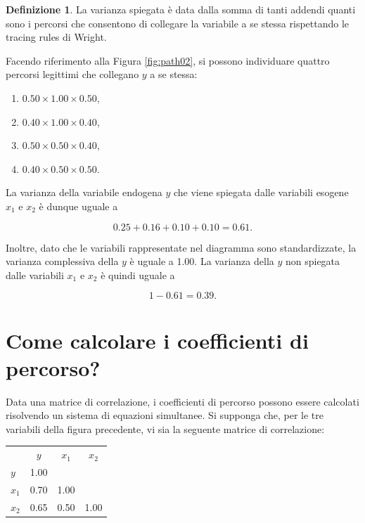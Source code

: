\documentclass[
  11pt,
]{krantz}
\providecommand{\tightlist}{%
  \setlength{\itemsep}{0pt}\setlength{\parskip}{0pt}}
\theoremstyle{definition}
\newtheorem{definition}{Definizione}[chapter]
\theoremstyle{definition}
\theoremstyle{definition}
\theoremstyle{definition}
\theoremstyle{remark}
\begin{document}
\begin{definition}
La varianza spiegata è data dalla somma di tanti addendi quanti sono i percorsi che consentono di collegare la variabile a se stessa rispettando le tracing rules di Wright.
\end{definition}

Facendo riferimento alla Figura \ref{fig:path02}, si possono individuare quattro percorsi legittimi che collegano \(y\) a se stessa:

\begin{enumerate}
\def\labelenumi{\arabic{enumi}.}
\tightlist
\item
  \(0.50 \times 1.00 \times 0.50\),
\item
  \(0.40 \times 1.00 \times 0.40\),
\item
  \(0.50 \times 0.50 \times 0.40\),
\item
  \(0.40 \times 0.50 \times 0.50\).
\end{enumerate}

La varianza della variabile endogena \(y\) che viene spiegata dalle variabili esogene \(x_1\) e \(x_2\) è dunque uguale a

\[
0.25 + 0.16  + 0.10 + 0.10= 0.61.
\]

Inoltre, dato che le variabili rappresentate nel diagramma sono standardizzate, la varianza complessiva della \(y\) è uguale a 1.00. La varianza della \(y\) non spiegata dalle variabili \(x_1\) e \(x_2\) è quindi uguale a

\[
1-0.61 = 0.39.
\]

\hypertarget{sec:how_compute_path_coef}{%
\section{Come calcolare i coefficienti di percorso?}\label{sec:how_compute_path_coef}}

Data una matrice di correlazione, i coefficienti di percorso possono essere calcolati risolvendo un sistema di equazioni simultanee. Si supponga che, per le tre variabili della figura precedente, vi sia la seguente matrice di correlazione:

\begin{longtable}[]{@{}lccc@{}}
\toprule
\endhead
& \(y\) & \(x_1\) & \(x_2\) \\
\(y\) & 1.00 & & \\
\(x_1\) & 0.70 & 1.00 & \\
\(x_2\) & 0.65 & 0.50 & 1.00 \\
\bottomrule
\end{longtable}
\end{document}
